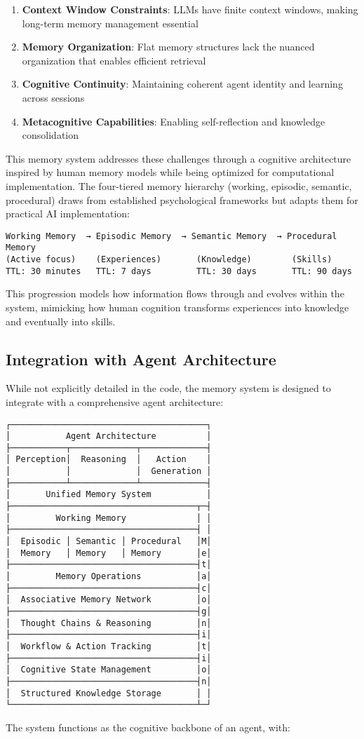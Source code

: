 \documentclass[12pt,a4paper]{article}
\begin{document}
\begin{enumerate}[label=\arabic*.]
    \item \textbf{Context Window Constraints}: LLMs have finite context windows, making long-term memory management essential
    \item \textbf{Memory Organization}: Flat memory structures lack the nuanced organization that enables efficient retrieval
    \item \textbf{Cognitive Continuity}: Maintaining coherent agent identity and learning across sessions
    \item \textbf{Metacognitive Capabilities}: Enabling self-reflection and knowledge consolidation
\end{enumerate}

This memory system addresses these challenges through a cognitive architecture inspired by human memory models while being optimized for computational implementation. The four-tiered memory hierarchy (working, episodic, semantic, procedural) draws from established psychological frameworks but adapts them for practical AI implementation:
\begin{verbatim}
Working Memory  → Episodic Memory  → Semantic Memory  → Procedural Memory
(Active focus)    (Experiences)       (Knowledge)        (Skills)
TTL: 30 minutes   TTL: 7 days         TTL: 30 days       TTL: 90 days
\end{verbatim}
This progression models how information flows through and evolves within the system, mimicking how human cognition transforms experiences into knowledge and eventually into skills.

\subsection*{Integration with Agent Architecture}

While not explicitly detailed in the code, the memory system is designed to integrate with a comprehensive agent architecture:
\begin{verbatim}
┌───────────────────────────────────────┐
│           Agent Architecture          │
├───────────┬─────────────┬─────────────┤
│ Perception│  Reasoning  │   Action    │
│           │             │  Generation │
├───────────┴─────────────┴─────────────┤
│       Unified Memory System           │
├─────────────────────────────────────┬─┤
│         Working Memory              │ │
├─────────────────────────────────────┤ │
│  Episodic │ Semantic │ Procedural   │M│
│  Memory   │ Memory   │ Memory       │e│
├─────────────────────────────────────┤t│
│         Memory Operations           │a│
├─────────────────────────────────────┤c│
│  Associative Memory Network         │o│
├─────────────────────────────────────┤g│
│  Thought Chains & Reasoning         │n│
├─────────────────────────────────────┤i│
│  Workflow & Action Tracking         │t│
├─────────────────────────────────────┤i│
│  Cognitive State Management         │o│
├─────────────────────────────────────┤n│
│  Structured Knowledge Storage       │ │
└─────────────────────────────────────┴─┘
\end{verbatim}
The system functions as the cognitive backbone of an agent, with:
\end{document}

